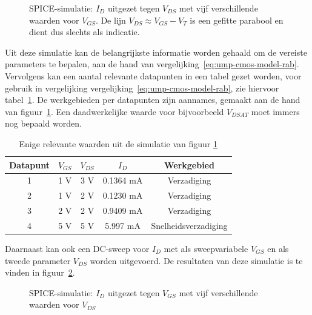 \documentclass{article}
\begin{document}
\begin{figure}[H]
	\centering
	\setlength{} 
	\setlength{}
	
	\caption{SPICE-simulatie: $I_{D}$ uitgezet tegen $V_{DS}$ met vijf verschillende waarden voor $V_{GS}$. De lijn $V_{DS} \approx V_{GS} - V_{T}$ is een gefitte parabool en dient dus slechts als indicatie.}
	\label{fig:ump-sim-fig-vds}
\end{figure}

Uit deze simulatie kan de belangrijkste informatie worden gehaald om de vereiste parameters te bepalen, aan de hand van vergelijking~\ref{eq:ump-cmos-model-rab}. Vervolgens kan een aantal relevante datapunten in een tabel gezet worden, voor gebruik in vergelijking vergelijking~\ref{eq:ump-cmos-model-rab}, zie hiervoor tabel~\ref{tab:ump-sim-tab-vds}. De werkgebieden per datapunten zijn aannames, gemaakt aan de hand van figuur~\ref{fig:ump-sim-fig-vds}. Een daadwerkelijke waarde voor bijvoorbeeld $V_{DSAT}$ moet immers nog bepaald worden. 

\begin{table}[h]
	\centering
	\caption{Enige relevante waarden uit de simulatie van figuur \ref{fig:ump-sim-fig-vds}}
	\label{tab:ump-sim-tab-vds}
	\begin{tabular}{|c|c|c|c|c|} 	
		\hline
		Datapunt & $V_{GS}$ & $V_{DS}$ & $I_{D}$ & Werkgebied \\
		\hline
		1 & 1 V & 3 V & 0.1364 mA & Verzadiging \\
		\hline
		2 & 1 V & 2 V & 0.1230 mA & Verzadiging \\
		\hline
		3 & 2 V & 2 V & 0.9409 mA & Verzadiging \\
		\hline
		4 & 5 V & 5 V & 5.997 mA & Snelheidsverzadiging \\
		\hline	
	\end{tabular}
\end{table}

Daarnaast kan ook een DC-sweep voor $I_{D}$ met als sweepvariabele $V_{GS}$ en als tweede parameter $V_{DS}$ worden uitgevoerd. De resultaten van deze simulatie is te vinden in figuur~\ref{fig:ump-sim-fig-vgs}.

\begin{figure}[H]
	\centering
	\setlength{} 
	\setlength{}
	
	\caption{SPICE-simulatie: $I_{D}$ uitgezet tegen $V_{GS}$ met vijf verschillende waarden voor $V_{DS}$}
	\label{fig:ump-sim-fig-vgs}
\end{figure}
\end{document}
